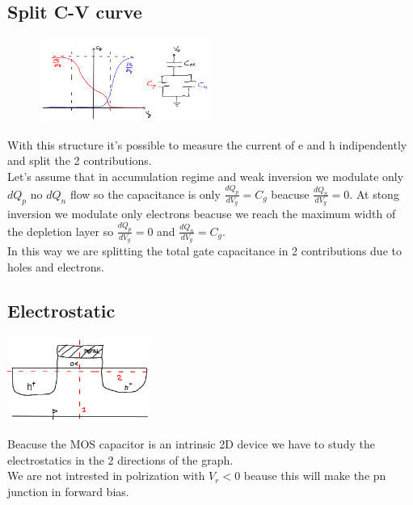 \subsection{Split C-V curve}
\begin{figure}
\includegraphics[width=0.5\textwidth]{splitcv.png}
\end{figure}
With this structure it's possible to measure the current of e and h indipendently and split the 2 contributions.\\
Let's assume that in accumulation regime and weak inversion we modulate only $dQ_p$ no $dQ_n$ flow so the capacitance is only $\frac{dQ_p}{dV_g}=C_g$ beacuse $\frac{dQ_n}{dV_g}=0$.
At stong inversion we modulate only electrons beacuse we reach the maximum width of the depletion layer so $\frac{dQ_p}{dV_g}=0$ and $\frac{dQ_n}{dV_g}=C_g$.\\ In this way we are splitting the total gate capacitance in 2 contributions due to holes and electrons.\\


\subsection{Electrostatic}
\centering
\includegraphics[width=0.35\textwidth]{sections.png}\\
\raggedright

Beacuse the MOS capacitor is an intrinsic 2D device we have to study the electrostatics in the 2 directions of the graph. \\ 
We are not intrested in polrization with $V_r<0$ beause this will make the pn junction in forward bias.\\

